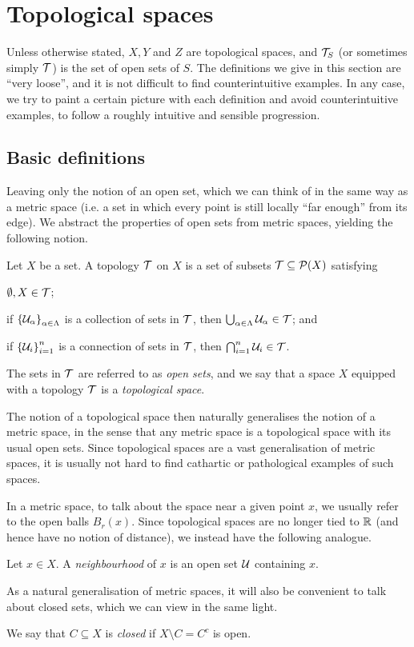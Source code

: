 \documentclass[11pt]{article}
\begin{document}
\section{Topological spaces}
Unless otherwise stated, $X, Y$ and $Z$ are topological spaces, and $\mathcal{T}_S$ (or sometimes simply $\mathcal{T}$) is the set of open sets of $S$. The definitions we give in this section are ``very loose'', and it is not difficult to find counterintuitive examples. In any case, we try to paint a certain picture with each definition and avoid counterintuitive examples, to follow a roughly intuitive and sensible progression.
\subsection{Basic definitions}
Leaving only the notion of an open set, which we can think of in the same way as a metric space (i.e. a set in which every point is still locally ``far enough'' from its edge). We abstract the properties of open sets from metric spaces, yielding the following notion.
\begin{definition}
    Let $X$ be a set. A topology $\mathcal{T}$ on $X$ is a set of subsets $\mathcal{T} \subseteq \mathcal{P}(X)$ satisfying
    \begin{enum}
        \item $\emptyset, X \in \mathcal{T}$;
        \item if $\left\{  \mathcal{U}_\alpha  \right\}_{\alpha \in \Lambda}$ is a collection of sets in $\mathcal{T}$, then $\bigcup_{\alpha \in \Lambda} \mathcal{U}_\alpha \in \mathcal{T}$; and
        \item if $\left\{  \mathcal{U}_i  \right\}_{i = 1}^n$ is a connection of sets in $\mathcal{T}$, then $\bigcap_{i = 1}^n \mathcal{U}_i \in \mathcal{T}$.
    \end{enum}
    The sets in $\mathcal{T}$ are referred to as \emph{open sets}, and we say that a space $X$ equipped with a topology $\mathcal{T}$ is a \emph{topological space}.
\end{definition}
The notion of a topological space then naturally generalises the notion of a metric space, in the sense that any metric space is a topological space with its usual open sets. Since topological spaces are a vast generalisation of metric spaces, it is usually not hard to find cathartic or pathological examples of such spaces.

In a metric space, to talk about the space near a given point $x$, we usually refer to the open balls $B_r(x)$. Since topological spaces are no longer tied to $\mathbb{R}$ (and hence have no notion of distance), we instead have the following analogue.
\begin{definition}[Neighbourhood]
    Let $x \in X$. A \emph{neighbourhood} of $x$ is an open set $\mathcal{U}$ containing $x$.
\end{definition}
As a natural generalisation of metric spaces, it will also be convenient to talk about closed sets, which we can view in the same light.
\begin{definition}
    We say that $C \subseteq X$ is \emph{closed} if $X \setminus C = C^c$ is open.
\end{definition}
\end{document}
